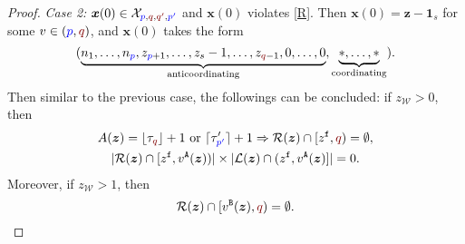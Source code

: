 \documentclass[10 pt,twocolumn,journal]{IEEEtran}
\DeclarePairedDelimiter{\ceil}{\lceil}{\rceil}
\DeclarePairedDelimiter{\floor}{\lfloor}{\rfloor}
\theoremstyle{plain}
\newcommand{\A}{\mathcal{A}}
\newcommand{\I}{\mathcal{I}}
\newcommand{\X}{\mathcal{X}}
\newcommand{\W}{\mathcal{W}}
\newcommand{\R}{\mathcal{R}}
\renewcommand{\L}{\mathcal{L}}
\newcommand{\x}{\bm{x}}
\newcommand{\z}{\bm{z}}
\newcommand{\p}{\tb{p}}
\newcommand{\pp}{\tb{p'}}
\newcommand{\q}{\tr{q}}
\newcommand{\qq}{\tr{q'}}
\newcommand{\f}{\mathtt{f}}
\renewcommand{\A}{\mathtt{A}}
\newcommand{\B}{\mathtt{B}}
\newcommand{\tb}{\textcolor{blue}}
\newcommand{\tr}{\textcolor{Myred}}
\theoremstyle{definition}
\begin{document}
\begin{proof}
\emph{Case 2:} 
$\x(0) \in \X_{\p,\q,\qq ,\pp }$ and $\x(0)$ violates \eqref{R}.
Then $\x(0)=\z-\bm{1}_s$ for some $v\in(\p,\q)$, and $\x(0)$ takes the form
\begin{equation*}\scalebox{1}{\text{$
    (\underbrace{n_1,\ldots,n_{\p},z_{\p+1},\ldots,z_s-1,\ldots,z_{\q-1}, 0,\ldots,0}_{\text{anticoordinating}}, 
    \underbrace{*, \ldots, *}_{\text{coordinating}})$}}.
\end{equation*}
%
%
%
Then similar to the previous case, the followings can be concluded:
if $z_\W>0$, then
\begin{gather} 
A(\z)=\floor{\tau_{\q}}+1 \text{ or } \ceil{\tau'_{\pp}}+1
    \Rightarrow
    \R(\z)\cap[z^{\f},\q) = \emptyset, \label{stabilityTheorem_eq33}\\
         |\R(\z)\cap[z^{\f},v^{\A}(\z))| \times |\L(\z)\cap(z^{\f},v^{\A}(\z)]| = 0. \label{stabilityTheorem_eq34}
\end{gather}
Moreover, if $z_\W>1$, then
\begin{equation}    \label{stabilityTheorem_eq35}
    \R(\z)\cap[v^{\B}(\z),\q) = \emptyset.
\end{equation}



\end{proof}
\end{document}
